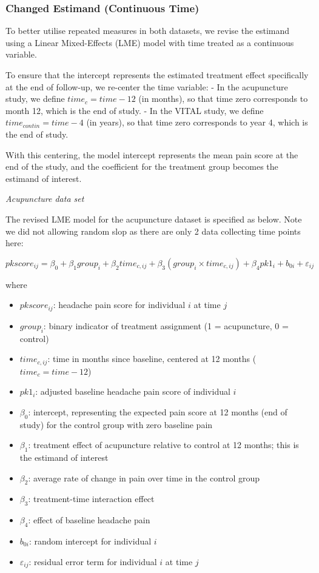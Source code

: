\documentclass{article}
\providecommand{\tightlist}{%
  \setlength{\itemsep}{0pt}\setlength{\parskip}{0pt}}
\begin{document}
\subsubsection{Changed Estimand (Continuous
Time)}\label{changed-estimand-continuous-time}

To better utilise repeated measures in both datasets, we revise the
estimand using a Linear Mixed-Effects (LME) model with time treated as a
continuous variable.

To ensure that the intercept represents the estimated treatment effect
specifically at the end of follow-up, we re-center the time variable: -
In the acupuncture study, we define \(time_c = time - 12\) (in months),
so that time zero corresponds to month 12, which is the end of study. -
In the VITAL study, we define \(time_{contin} = time - 4\) (in years),
so that time zero corresponds to year 4, which is the end of study.

With this centering, the model intercept represents the mean pain score
at the end of the study, and the coefficient for the treatment group
becomes the estimand of interest.

\emph{Acupuncture data set}

The revised LME model for the acupuncture dataset is specified as below.
Note we did not allowing random slop as there are only 2 data collecting
time points here:

\[pkscore_{ij} = \beta_0 + \beta_1 group_i + \beta_2 time_{c,ij} + \beta_3 (group_i \times time_{c,ij}) + \beta_4 pk1_i + b_{0i} + \varepsilon_{ij}\]

where

\begin{itemize}
\tightlist
\item
  \(pkscore_{ij}\): headache pain score for individual \(i\) at time
  \(j\)
\item
  \(group_i\): binary indicator of treatment assignment (1 =
  acupuncture, 0 = control)
\item
  \(time_{c,ij}\): time in months since baseline, centered at 12 months
  (\(time_c = time - 12\))
\item
  \(pk1_i\): adjusted baseline headache pain score of individual \(i\)
\item
  \(\beta_0\): intercept, representing the expected pain score at 12
  months (end of study) for the control group with zero baseline pain
\item
  \(\beta_1\): treatment effect of acupuncture relative to control at 12
  months; this is the estimand of interest
\item
  \(\beta_2\): average rate of change in pain over time in the control
  group
\item
  \(\beta_3\): treatment-time interaction effect
\item
  \(\beta_4\): effect of baseline headache pain
\item
  \(b_{0i}\): random intercept for individual \(i\)
\item
  \(\varepsilon_{ij}\): residual error term for individual \(i\) at time
  \(j\)
\end{itemize}
\end{document}
